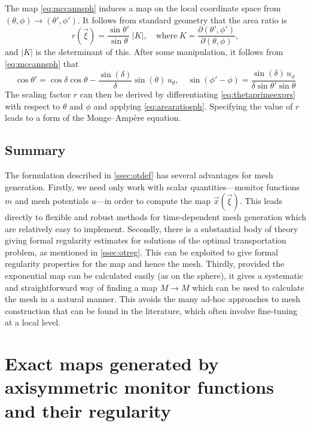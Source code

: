 \documentclass[11pt, a4paper]{scrartcl}  %
\theoremstyle{plain}
\theoremstyle{definition}
\numberwithin{equation}{section}
\begin{document}
The map \cref{eq:mccannsph} induces a map on the local coordinate space
from $(\theta, \phi) \to (\theta', \phi')$. It follows from standard
geometry that the area ratio is
\begin{equation}
\label{eq:arearatiosph}
r(\vec{\xi}) = \frac{\sin\theta'}{\sin\theta} \; |K|, \quad \mbox{where}\ K = \frac{\partial(\theta',\phi')}{\partial(\theta,\phi)},
\end{equation}
and $|K|$ is the determinant of this. After some manipulation, it
follows from \cref{eq:mccannsph} that
\begin{equation}
\label{eq:thetaprimeexprs}
\cos\theta' = \cos\delta \cos\theta - \frac{\sin(\delta)}{\delta} \sin(\theta) \, u_\theta, \quad
\sin(\phi' - \phi) = \frac{\sin(\delta) \, u_\phi}{\delta \sin\theta' \sin\theta}
\end{equation}
The scaling factor $r$ can then be derived by differentiating
\cref{eq:thetaprimeexprs} with respect to $\theta$ and $\phi$ and
applying \cref{eq:arearatiosph}. Specifying the value of $r$ leads to a
form of the Monge--Ampère equation.

\subsection{Summary}

The formulation described in \cref{ssec:otdef} has several advantages
for mesh generation. Firstly, we need only work with scalar
quantities---monitor functions $m$ and mesh potentials $u$---in order to
compute the map $\vec{x}(\vec{\xi})$. This leads directly to flexible
and robust methods for time-dependent mesh generation which are
relatively easy to implement. Secondly, there is a substantial
body of theory giving formal regularity estimates for solutions of the
optimal transportation problem, as mentioned in \cref{ssec:otreg}. This
can be exploited to give formal regularity properties for the map and
hence the mesh. Thirdly, provided the exponential map can be calculated
easily (as on the sphere), it gives a systematic and straightforward way
of finding a map $M \to M$ which can be used to calculate the mesh in a
natural manner. This avoids the many ad-hoc approaches to mesh
construction that can be found in the literature, which often involve
fine-tuning at a local level.

\section{Exact maps generated by axisymmetric monitor functions and their regularity}
\label{sec:axisym}
\end{document}
